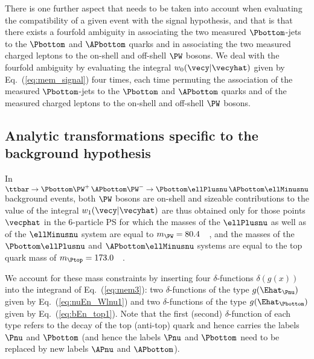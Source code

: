 There is one further aspect that needs to be taken into account when evaluating the compatibility of a given event with the signal hypothesis,
and that is that there exists a fourfold ambiguity in associating the two measured $\Pbottom$-jets to the $\Pbottom$ and $\APbottom$ quarks 
and in associating the two measured charged leptons to the on-shell and off-shell $\PW$ bosons.
We deal with the fourfold ambiguity by evaluating the integral $w_{0}(\vecy|\vecyhat)$ given by Eq.~(\ref{eq:mem_signal}) four times,
each time permuting the association of the measured $\Pbottom$-jets to the $\Pbottom$ and $\APbottom$ quarks and of the measured charged leptons to the on-shell and off-shell $\PW$ bosons.


\subsection{Analytic transformations specific to the background hypothesis}
\label{sec:mem_background}

In $\ttbar \to \Pbottom\PW^{+} \, \APbottom\PW^{-} \to \Pbottom\ellPlusnu \, \APbottom\ellMinusnu$ background events,
both $\PW$ bosons are on-shell and sizeable contributions to the value of the integral $w_{1}(\vecy|\vecyhat)$ are thus obtained only
for those points $\vecphat$ in the $6$-particle PS for which
the masses of the $\ellPlusnu$ as well as of the $\ellMinusnu$ system are equal to $m_{\PW} = 80.4$~\GeV~\cite{PDG},
and the masses of the $\Pbottom\ellPlusnu$ and $\APbottom\ellMinusnu$ systems are equal to the top quark mass of $m_{\Ptop} = 173.0$~\GeV~\cite{PDG}.

We account for these mass constraints by inserting four $\delta$-functions $\delta\left( g(x) \right)$ into the integrand of Eq.~(\ref{eq:mem3}):
two $\delta$-functions of the type $g(\Ehat_{\Pnu})$ given by Eq.~(\ref{eq:nuEn_Wlnu1}) 
and two $\delta$-functions of the type $g(\Ehat_{\Pbottom})$ given by Eq.~(\ref{eq:bEn_top1}).
Note that the first (second) $\delta$-function of each type refers to the decay of the top (anti-top) quark and hence carries the labels $\Pnu$ and $\Pbottom$ 
(and hence the labels $\Pnu$ and $\Pbottom$ need to be replaced by new labels $\APnu$ and $\APbottom$).


